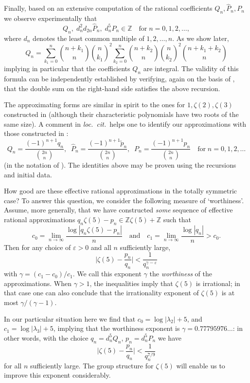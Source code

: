 \documentclass[12pt,reqno]{amsart}
\theoremstyle{remark}
\let\eps\varepsilon
\begin{document}
Finally, based on an extensive computation of  the rational coefficients $Q_n,\hat P_n,P_n$ we observe experimentally that
\begin{equation}
Q_n, \; d_n^2d_{2n}\hat P_n, \; d_n^5P_n\in\mathbb Z
\quad\text{for}\; n=0,1,2,\dots,
\label{dn-totsym}
\end{equation}
where $d_n$ denotes the least common multiple of $1,2,\dots,n$. As we show later,
\begin{equation}
Q_n=\sum_{k_1=0}^n\binom{n+k_1}{n}{\binom{n}{k_1}}^2
\sum_{k_2=0}^n\binom{n+k_2}{n}{\binom{n}{k_2}}^2
\binom{n+k_1+k_2}{n}
\label{Q_n}
\end{equation}
implying in particular that the coefficients $Q_n$ are integral.
The validity of this formula can be independently established by verifying, again on the basis of \cite{Ko10}, that the double sum on the right-hand side satisfies the above recursion. 

The approximating forms are similar in spirit to the ones for $1,\zeta(2),\zeta(3)$ constructed in \cite[Section~2]{Zu07}
(although  their characteristic polynomials have two roots of  the same size).  A  comment in \emph{loc.\ cit.}\ helps one to identify our approximations with those constructed in \cite[Theorem~1]{Zu02}:
\[
Q_n=\frac{(-1)^{n+1}q_n}{\binom{2n}n}, \;\; \hat P_n=\frac{(-1)^{n+1}\tilde p_n}{\binom{2n}n}, \;\; P_n=\frac{(-1)^{n+1}p_n}{\binom{2n}n}
\quad\text{for}\; n=0,1,2,\dots
\]
(in the notation of \cite{Zu02}). The identities  above may be proven using the  recursions and initial data.

How good are these effective rational approximations in the totally symmetric case? To answer this question, we consider the following measure of 
`worthiness'.  Assume, more generally, that we have constructed \emph{some} sequence of effective rational approximations $q_n\zeta(5)-p_n\in\mathbb Z\zeta(5)+\mathbb Z$ such that
\[
c_0=\lim_{n\to\infty}\frac{\log|q_n\zeta(5)-p_n|}n
\quad\text{and}\quad
c_1=\lim_{n\to\infty}\frac{\log|q_n|}n>c_0.
\]
Then for any choice of $\eps>0$ and all $n$ sufficiently large,
\[
\bigg|\zeta(5)-\frac{p_n}{q_n}\bigg|<\frac1{q_n^{\gamma-\eps}}
\]
with $\gamma=(c_1-c_0)/c_1$.
We call this exponent  $\gamma$ the \emph{worthiness} of the approximations.
When $\gamma>1$, the inequalities imply that $\zeta(5)$ is irrational;
in that case one can also conclude that the irrationality exponent of  $\zeta(5)$ is at most $\gamma/(\gamma-1)$.

In our particular situation here we find that  $c_0=\log|\lambda_2|+5$, and $c_1=\log|\lambda_3|+5$, implying  that the worthiness exponent is $\gamma=0.77795976\dots$: in other words, with the choice $q_n=d_n^5Q_n$, $p_n=d_n^5P_n$ we have
\[
\bigg|\zeta(5)-\frac{p_n}{q_n}\bigg|<\frac1{q_n^{7/9}}
\]
for all $n$ sufficiently large. The group structure for $\zeta(5)$ will enable us to improve this exponent considerably. 
\end{document}
